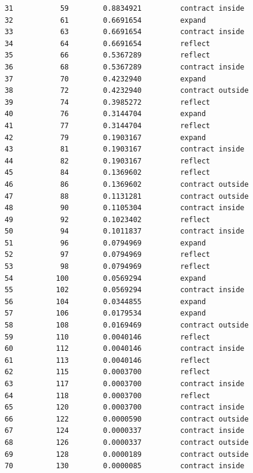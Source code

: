 \begin{lstlisting}
    31           59        0.8834921         contract inside     
    32           61        0.6691654         expand              
    33           63        0.6691654         contract inside     
    34           64        0.6691654         reflect             
    35           66        0.5367289         reflect             
    36           68        0.5367289         contract inside     
    37           70        0.4232940         expand              
    38           72        0.4232940         contract outside    
    39           74        0.3985272         reflect             
    40           76        0.3144704         expand              
    41           77        0.3144704         reflect             
    42           79        0.1903167         expand              
    43           81        0.1903167         contract inside     
    44           82        0.1903167         reflect             
    45           84        0.1369602         reflect             
    46           86        0.1369602         contract outside    
    47           88        0.1131281         contract outside    
    48           90        0.1105304         contract inside     
    49           92        0.1023402         reflect             
    50           94        0.1011837         contract inside     
    51           96        0.0794969         expand              
    52           97        0.0794969         reflect             
    53           98        0.0794969         reflect             
    54          100        0.0569294         expand              
    55          102        0.0569294         contract inside     
    56          104        0.0344855         expand              
    57          106        0.0179534         expand              
    58          108        0.0169469         contract outside    
    59          110        0.0040146         reflect             
    60          112        0.0040146         contract inside     
    61          113        0.0040146         reflect             
    62          115        0.0003700         reflect             
    63          117        0.0003700         contract inside     
    64          118        0.0003700         reflect             
    65          120        0.0003700         contract inside     
    66          122        0.0000590         contract outside    
    67          124        0.0000337         contract inside     
    68          126        0.0000337         contract outside    
    69          128        0.0000189         contract outside    
    70          130        0.0000085         contract inside     

\end{lstlisting}
